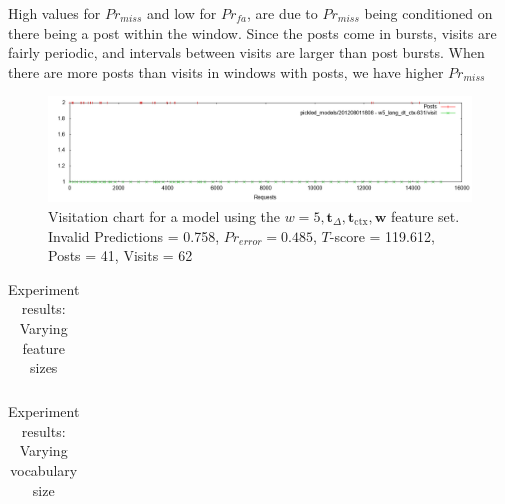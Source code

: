 \documentclass[12 pt]{article}
\begin{document}
High values for $Pr_{miss}$ and low for $Pr_{fa}$, are due to $Pr_{miss}$ being conditioned on there being a post within the window. Since the posts come in bursts, visits are fairly periodic, and intervals between visits are larger than post bursts. When there are more posts than visits in windows with posts, we have higher $Pr_{miss}$

\begin{landscape}
\begin{figure}
	\centering
	\includegraphics[scale=0.5]{example_seq.png}
	\caption{Visitation chart for a model using the $w=5, \mathbf{t}_\Delta, \mathbf{t}_{\text{ctx}},\mathbf{w}$ feature set. Invalid Predictions = 0.758, $Pr_{error} =  0.485$, $T$-score = 119.612, Posts = 41, Visits = 62}
\end{figure}
\end{landscape}

\begin{table}
	\footnotesize
	\begin{centering}
	\begin{tabular}{|l|c|c|c|c|c|c|c|c|}
	\hline
	
	\hline
	\end{tabular}
	\caption{Experiment results: Varying feature sizes}
	\label{exp_f_size}
\end{centering}
\end{table}

\begin{table}
	\footnotesize
	\begin{centering}
	\begin{tabular}{|l|c|c|c|c|c|c|c|c|}
	\hline
	
	\hline
	\end{tabular}
	\caption{Experiment results: Varying vocabulary size}
	\label{vocab_exp}
\end{centering}
\end{table}





\end{document}
